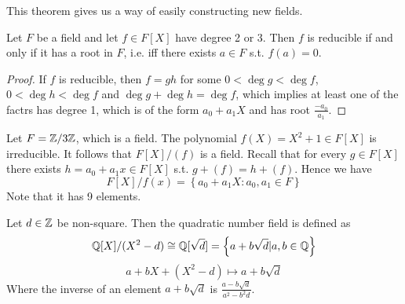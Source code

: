 

  
  

This theorem gives us a way of easily constructing new fields.
\begin{theorem}
  Let $F$ be a field and let $f\in F[X]$ have degree 2 or 3. Then $f$ is reducible if and
  only if it has a root in $F$, i.e. iff there exists $a\in F$ s.t. $f(a)=0$.
  \label{thm:deg2o3Root}
\end{theorem}
\begin{proof}
  If $f$ is reducible, then $f=gh$ for some $0<\deg g<\deg f$, $0<\deg h<\deg f$ and
  $\deg g + \deg h = \deg f$, which implies at least one of the factrs has degree 1,
  which is of the form $a_0+a_1X$ and has root $\frac{-a_0}{a_1}$.
\end{proof}

\begin{example}
  Let $F=\mathbb Z/3\mathbb Z$, which is a field. The polynomial $f(X)=X^2+1\in F[X]$ is
  irreducible. It follows that $F[X]/(f)$ is a field. Recall that for every $g\in F[X]$
  there exists $h=a_0+a_1x\in F[X]$ s.t. $g+(f)=h+(f)$. Hence we have
  \[F[X]/f(x) = \left\{ a_0+a_1X : a_0,a_1\in F \right\}\]
  Note that it has 9 elements.
\end{example}

\begin{example}
  Let $d\in \mathbb Z$ be non-square. Then the quadratic number field is defined as
  \[\mathbb Q[X]/(X^2-d) \cong \mathbb Q[\sqrt{d}]=\left\{ a+b\sqrt{d} | a,b\in \mathbb Q \right\}\]
  \[a+bX+(X^2-d) \mapsto a+b\sqrt{d}\]
  Where the inverse of an element $a+b\sqrt{d}$ is $\frac{a-b\sqrt{d}}{a^2-b^2d}$.
\end{example}

